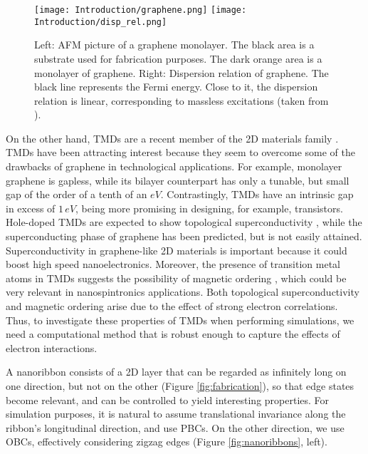 \begin{figure}[H]
\hspace{1cm}
\texttt{[image: Introduction/graphene.png]}
\hspace{3cm}
\texttt{[image: Introduction/disp\_rel.png]}
\caption[Graphene monolayer; graphene's dispersion relation.]{Left: \acf{AFM} picture of a graphene monolayer. The black area is a substrate used for fabrication purposes. The dark orange area is a monolayer of graphene. Right: Dispersion relation of graphene. The black line represents the Fermi energy. Close to it, the dispersion relation is linear, corresponding to massless excitations (taken from \cite{noauthor_nobel_nodate}). }
\label{fig:graphene}
\end{figure}	

On the other hand, \acp{TMD} are a recent member of the \ac{2D} materials family \cite{wang_electronics_2012, roldan_electronic_2014, xu_spin_2014}.
\acp{TMD} have been attracting interest because they seem to overcome some of the drawbacks of graphene in technological applications.
For example, monolayer graphene is gapless, while its bilayer counterpart has only a tunable, but small gap of the order of a tenth of an $eV$.
Contrastingly, \acp{TMD} have an intrinsic gap in excess of $1 \, eV$, being more promising in designing, for example, transistors.
Hole-doped \acp{TMD} are expected to show topological superconductivity \cite{hsu_topological_2017}, while the superconducting phase of graphene has been predicted, but is not easily attained.
Superconductivity in graphene-like \ac{2D} materials is important because it could boost high speed nanoelectronics.
Moreover, the presence of transition metal atoms in \acp{TMD} suggests the possibility of magnetic ordering \cite{braz_valley_2017}, which could be very relevant in nanospintronics applications.
Both topological superconductivity and magnetic ordering arise due to the effect of strong electron correlations.
Thus, to investigate these properties of \acp{TMD} when performing simulations, we need a computational method that is robust enough to capture the effects of electron interactions.

A nanoribbon consists of a \ac{2D} layer that can be regarded as infinitely long on one direction, but not on the other (Figure \ref{fig:fabrication}), so that edge states become relevant, and can be controlled to yield interesting properties.
For simulation purposes, it is natural to assume translational invariance along the ribbon's longitudinal direction, and use \acp{PBC}.
On the other direction, we use \acp{OBC}, effectively considering zigzag edges (Figure \ref{fig:nanoribbons}, left).


